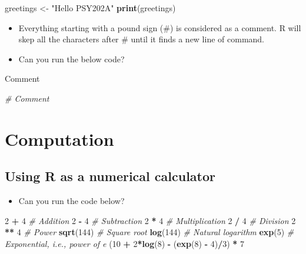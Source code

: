 \documentclass[
]{book}
\newenvironment{Shaded}{\begin{snugshade}}{\end{snugshade}}
\newcommand{\CommentTok}[1]{\textcolor[rgb]{0.56,0.35,0.01}{\textit{#1}}}
\newcommand{\DecValTok}[1]{\textcolor[rgb]{0.00,0.00,0.81}{#1}}
\newcommand{\FunctionTok}[1]{\textcolor[rgb]{0.13,0.29,0.53}{\textbf{#1}}}
\newcommand{\NormalTok}[1]{#1}
\newcommand{\OtherTok}[1]{\textcolor[rgb]{0.56,0.35,0.01}{#1}}
\newcommand{\SpecialCharTok}[1]{\textcolor[rgb]{0.81,0.36,0.00}{\textbf{#1}}}
\newcommand{\StringTok}[1]{\textcolor[rgb]{0.31,0.60,0.02}{#1}}
\providecommand{\tightlist}{%
  \setlength{\itemsep}{0pt}\setlength{\parskip}{0pt}}
\begin{document}
\begin{Shaded}
\begin{Highlighting}[]
\NormalTok{greetings }\OtherTok{\textless{}{-}} \StringTok{"Hello PSY202A"}
\FunctionTok{print}\NormalTok{(greetings)}
\end{Highlighting}
\end{Shaded}

\begin{itemize}
\item
  Everything starting with a pound sign (\#) is considered as a comment. R will skep all the characters after \# until it finds a new line of command.
\item
  Can you run the below code?
\end{itemize}

\begin{Shaded}
\begin{Highlighting}[]
\NormalTok{Comment}

\CommentTok{\# Comment}
\end{Highlighting}
\end{Shaded}

\section{Computation}\label{computation}

\subsection{Using R as a numerical calculator}\label{using-r-as-a-numerical-calculator}

\begin{itemize}
\tightlist
\item
  Can you run the code below?
\end{itemize}

\begin{Shaded}
\begin{Highlighting}[]
\DecValTok{2} \SpecialCharTok{+} \DecValTok{4} \CommentTok{\# Addition}
\DecValTok{2} \SpecialCharTok{{-}} \DecValTok{4} \CommentTok{\# Subtraction}
\DecValTok{2} \SpecialCharTok{*} \DecValTok{4} \CommentTok{\# Multiplication}
\DecValTok{2} \SpecialCharTok{/} \DecValTok{4} \CommentTok{\# Division}
\DecValTok{2} \SpecialCharTok{**} \DecValTok{4} \CommentTok{\# Power}
\FunctionTok{sqrt}\NormalTok{(}\DecValTok{144}\NormalTok{) }\CommentTok{\# Square root}
\FunctionTok{log}\NormalTok{(}\DecValTok{144}\NormalTok{) }\CommentTok{\# Natural logarithm}
\FunctionTok{exp}\NormalTok{(}\DecValTok{5}\NormalTok{) }\CommentTok{\# Exponential, i.e., power of e}
\NormalTok{(}\DecValTok{10} \SpecialCharTok{+} \DecValTok{2}\SpecialCharTok{*}\FunctionTok{log}\NormalTok{(}\DecValTok{8}\NormalTok{) }\SpecialCharTok{{-}}\NormalTok{ (}\FunctionTok{exp}\NormalTok{(}\DecValTok{8}\NormalTok{) }\SpecialCharTok{{-}} \DecValTok{4}\NormalTok{)}\SpecialCharTok{/}\DecValTok{3}\NormalTok{) }\SpecialCharTok{*} \DecValTok{7}
\end{Highlighting}
\end{Shaded}
\end{document}
